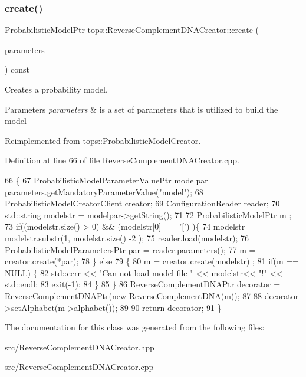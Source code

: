 \subsubsection{\texorpdfstring{create()}{create()}}
{\footnotesize\ttfamily Probabilistic\+Model\+Ptr tops\+::\+Reverse\+Complement\+D\+N\+A\+Creator\+::create (\begin{DoxyParamCaption}\item[{\hyperlink{classtops_1_1ProbabilisticModelParameters}{Probabilistic\+Model\+Parameters} \&}]{parameters }\end{DoxyParamCaption}) const\hspace{0.3cm}{\ttfamily [virtual]}}



Creates a probability model. 


\begin{DoxyParams}{Parameters}
{\em parameters} & is a set of parameters that is utilized to build the model \\
\hline
\end{DoxyParams}


Reimplemented from \hyperlink{classtops_1_1ProbabilisticModelCreator_afed6c8ffa45fff446bdaa8b533da8f7c}{tops\+::\+Probabilistic\+Model\+Creator}.



Definition at line 66 of file Reverse\+Complement\+D\+N\+A\+Creator.\+cpp.


\begin{DoxyCode}
66                                                                                                            
       \{
67     ProbabilisticModelParameterValuePtr modelpar = parameters.getMandatoryParameterValue(\textcolor{stringliteral}{"model"});
68     ProbabilisticModelCreatorClient creator;
69     ConfigurationReader reader;
70     std::string modelstr = modelpar->getString();
71 
72     ProbabilisticModelPtr m ;
73     \textcolor{keywordflow}{if}((modelstr.size() > 0) && (modelstr[0] == \textcolor{charliteral}{'['}) )\{
74       modelstr = modelstr.substr(1, modelstr.size() -2 );
75       reader.load(modelstr);
76       ProbabilisticModelParametersPtr par = reader.parameters();
77       m = creator.create(*par);
78     \} \textcolor{keywordflow}{else}
79       \{
80         m = creator.create(modelstr) ;
81         \textcolor{keywordflow}{if}(m == NULL) \{
82           std::cerr << \textcolor{stringliteral}{"Can not load model file "} << modelstr<< \textcolor{stringliteral}{"!"} << std::endl;
83           exit(-1);
84         \}
85       \}
86     ReverseComplementDNAPtr decorator = ReverseComplementDNAPtr(\textcolor{keyword}{new} ReverseComplementDNA(m));
87 
88     decorator->setAlphabet(m->alphabet());
89 
90     \textcolor{keywordflow}{return} decorator;
91   \}
\end{DoxyCode}


The documentation for this class was generated from the following files\+:\begin{DoxyCompactItemize}
\item 
src/Reverse\+Complement\+D\+N\+A\+Creator.\+hpp\item 
src/Reverse\+Complement\+D\+N\+A\+Creator.\+cpp\end{DoxyCompactItemize}
